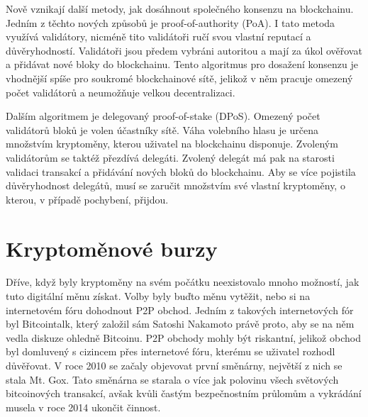 Nově vznikají další metody, jak dosáhnout společného konsenzu na blockchainu. Jedním z těchto nových způsobů je proof-of-authority (PoA). I tato
metoda využívá validátory, nicméně tito validátoři ručí svou vlastní reputací a důvěryhodností. Validátoři jsou předem vybráni autoritou a mají
za úkol ověřovat a přidávat nové bloky do blockchainu. Tento algoritmus pro dosažení konsenzu je vhodnější spíše pro soukromé blockchainové sítě,
jelikož v něm pracuje omezený počet validátorů a neumožňuje velkou decentralizaci.

Dalším algoritmem je delegovaný proof-of-stake (DPoS). Omezený počet validátorů bloků je volen účastníky sítě. Váha volebního hlasu
je určena množstvím kryptoměny, kterou uživatel na blockchainu disponuje. Zvoleným validátorům se taktéž přezdívá delegáti. Zvolený delegát má pak
na starosti validaci transakcí a přidávání nových bloků do blockchainu. Aby se více pojistila důvěryhodnost delegátů, musí se zaručit množstvím
své vlastní kryptoměny, o kterou, v případě pochybení, přijdou.


\section{Kryptoměnové burzy}
\label{sec:Exchanges}
Dříve, když byly kryptoměny na svém počátku neexistovalo mnoho možností, jak tuto digitální měnu získat. Volby byly buďto měnu vytěžit, nebo
si na internetovém fóru dohodnout P2P obchod. Jedním z takových internetových fór byl Bitcointalk, který založil sám Satoshi Nakamoto právě proto,
aby se na něm vedla diskuze ohledně Bitcoinu. P2P obchody mohly být riskantní, jelikož obchod byl domluvený s cizincem přes internetové fóru, kterému
se uživatel rozhodl důvěřovat. V roce 2010 se začaly objevovat první směnárny, největší z nich se stala Mt. Gox. Tato směnárna se starala o více jak polovinu
všech světových bitcoinových transakcí, avšak kvůli častým bezpečnostním průlomům a vykrádání musela v roce 2014 ukončit činnost.\cite{crypto:history}


